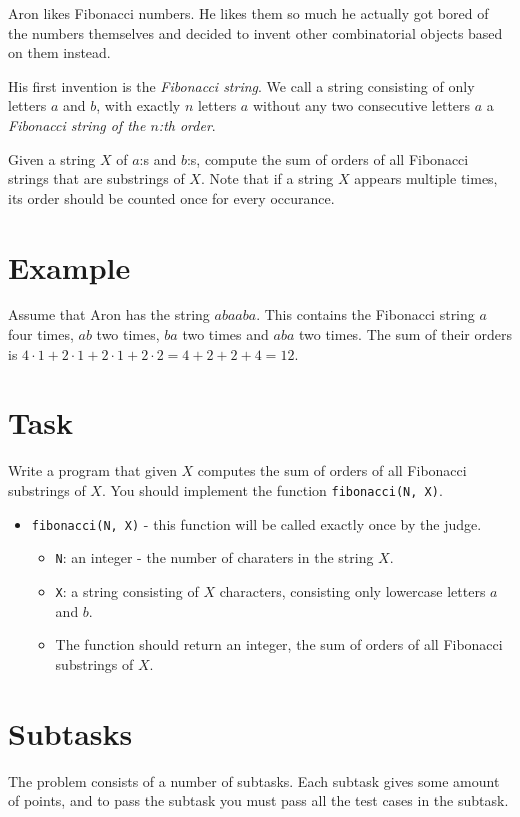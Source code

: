 \newcommand\version{v1}
Aron likes Fibonacci numbers. He likes them so much he actually got bored of the numbers themselves and decided to invent
other combinatorial objects based on them instead.

His first invention is the \emph{Fibonacci string}. We call a string consisting of only letters $a$ and $b$,
with exactly $n$ letters $a$ without any two consecutive letters $a$ a \emph{Fibonacci string of the $n$:th order}.

Given a string $X$ of $a$:s and $b$:s, compute the sum of orders of all Fibonacci strings that are substrings of $X$.
Note that if a string $X$ appears multiple times, its order should be counted once for every occurance.

\section*{Example}
Assume that Aron has the string $abaaba$. This contains the Fibonacci string $a$ four times, $ab$ two times, $ba$ two times and $aba$ two times.
The sum of their orders is $4 \cdot 1 + 2 \cdot 1 + 2 \cdot 1 + 2 \cdot 2 = 4 + 2 + 2 + 4 = 12$.

\section*{Task}
Write a program that given $X$ computes the sum of orders of all Fibonacci substrings of $X$.
You should implement the function \texttt{fibonacci(N, X)}.

\begin{itemize}
  \item \texttt{fibonacci(N, X)} - this function will be called exactly once by the judge.
  \begin{itemize}
    \item \texttt{N}: an integer - the number of charaters in the string $X$.
    \item \texttt{X}: a string consisting of $X$ characters, consisting only lowercase letters $a$ and $b$.
    \item The function should return an integer, the sum of orders of all Fibonacci substrings of $X$.
  \end{itemize}
\end{itemize}

\section*{Subtasks}
The problem consists of a number of subtasks. Each subtask gives some amount of points, and to pass
the subtask you must pass all the test cases in the subtask.

